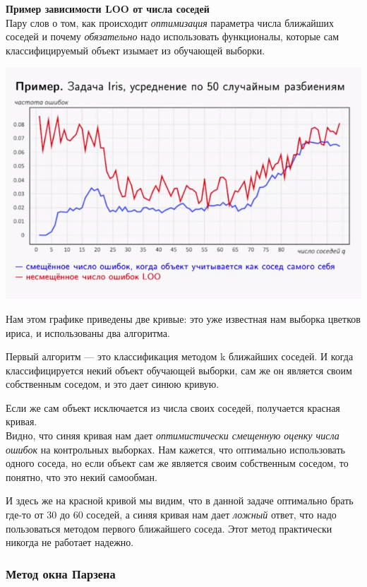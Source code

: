 \documentclass{article}
\begin{document}
\textbf{Пример зависимости LOO от числа соседей}
\\

Пару слов о том, как происходит \textit{оптимизация} параметра числа ближайших соседей и почему \textit{обязательно} надо использовать функционалы, которые сам классифицируемый объект изымает из обучающей выборки.

\begin{center}
    \includegraphics[scale=0.45]{images/4_2.png}
\end{center}

Нам этом графике приведены две кривые: это уже известная нам выборка цветков ириса, и использованы два алгоритма.

Первый алгоритм --- это классификация методом k ближайших соседей. И когда классифицируется некий объект обучающей выборки, сам же он является своим собственным соседом, и это дает синюю кривую. 

Если же сам объект исключается из числа своих соседей, получается красная кривая.
\\

Видно, что синяя кривая нам дает \textit{оптимистически смещенную оценку числа ошибок} на контрольных выборках. Нам кажется, что оптимально использовать одного соседа, но если объект сам же является своим собственным соседом, то понятно, что это некий самообман.

И здесь же на красной кривой мы видим, что в данной задаче оптимально брать где-то от 30 до 60 соседей, а синяя кривая нам дает \textit{ложный} ответ, что надо пользоваться методом первого ближайшего соседа. Этот метод практически никогда не работает надежно.

\newpage
\subsubsection{Метод окна Парзена}
\end{document}
